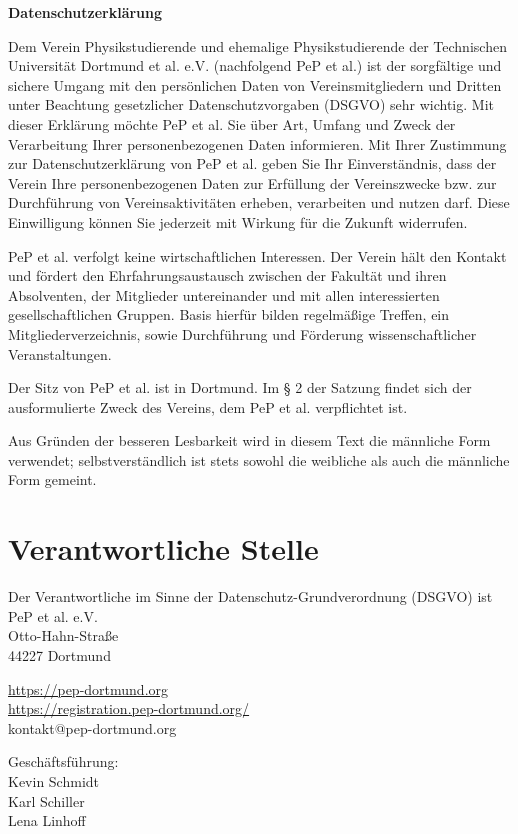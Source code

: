 \documentclass[
  fontsize=12pt,
  paper=a4,
  DIV14,
  parskip,
]{scrartcl}
\begin{document}
\textbf{\huge Datenschutzerklärung}

Dem Verein Physikstudierende und ehemalige Physikstudierende der Technischen
Universität Dortmund et al. e.V. (nachfolgend PeP et al.) ist der sorgfältige
und sichere Umgang mit den persönlichen Daten von Vereinsmitgliedern und
Dritten unter Beachtung gesetzlicher Datenschutzvorgaben (DSGVO) sehr
wichtig.
Mit dieser Erklärung möchte PeP et al. Sie über Art, Umfang und Zweck der
Verarbeitung Ihrer personenbezogenen Daten informieren.
Mit Ihrer Zustimmung zur Datenschutzerklärung von PeP et al. geben Sie Ihr
Einverständnis, dass der Verein Ihre personenbezogenen Daten zur Erfüllung
der Vereinszwecke bzw. zur Durchführung von Vereinsaktivitäten erheben,
verarbeiten und nutzen darf.
Diese Einwilligung können Sie jederzeit mit Wirkung für die Zukunft
widerrufen.

PeP et al. verfolgt keine wirtschaftlichen Interessen. Der Verein hält den
Kontakt und fördert den Ehrfahrungsaustausch zwischen der Fakultät und ihren
Absolventen, der Mitglieder untereinander und mit allen interessierten
gesellschaftlichen Gruppen.
Basis hierfür bilden regelmäßige Treffen, ein Mitgliederverzeichnis, sowie
Durchführung und Förderung wissenschaftlicher Veranstaltungen.

Der Sitz von PeP et al. ist in Dortmund. Im § 2 der Satzung findet sich der
ausformulierte Zweck des Vereins, dem PeP et al. verpflichtet ist.

Aus Gründen der besseren Lesbarkeit wird in diesem Text die männliche Form
verwendet; selbstverständlich ist stets sowohl die weibliche als auch die
männliche Form gemeint.

\section*{Verantwortliche Stelle}

Der Verantwortliche im Sinne der Datenschutz-Grundverordnung (DSGVO) ist\\
PeP et al. e.V.\\
Otto-Hahn-Straße\\
44227 Dortmund

\url{https://pep-dortmund.org}\\
\url{https://registration.pep-dortmund.org/}\\
kontakt@pep-dortmund.org

Geschäftsführung:\\
Kevin Schmidt\\
Karl Schiller\\
Lena Linhoff\\
\end{document}
